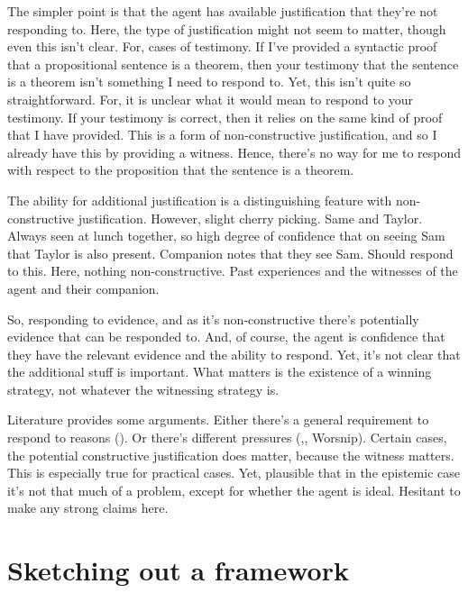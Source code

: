 \documentclass[10pt]{article}
\begin{document}
\begin{note}
  The simpler point is that the agent has available justification that they're not responding to.
  Here, the type of justification might not seem to matter, though even this isn't clear.
  For, cases of testimony.
  If I've provided a syntactic proof that a propositional sentence is a theorem, then your testimony that the sentence is a theorem isn't something I need to respond to.
  Yet, this isn't quite so straightforward.
  For, it is unclear what it would mean to respond to your testimony.
  If your testimony is correct, then it relies on the same kind of proof that I have provided.
  This is a form of non-constructive justification, and so I already have this by providing a witness.
  Hence, there's no way for me to respond with respect to the proposition that the sentence is a theorem.

  The ability for additional justification is a distinguishing feature with non-constructive justification.
  However, slight cherry picking.
  Same and Taylor.
  Always seen at lunch together, so high degree of confidence that on seeing Sam that Taylor is also present.
  Companion notes that they see Sam.
  Should respond to this.
  Here, nothing non-constructive.
  Past experiences and the witnesses of the agent and their companion.
\end{note}

\begin{note}
  So, responding to evidence, and as it's non-constructive there's potentially evidence that can be responded to.
  And, of course, the agent is confidence that they have the relevant evidence and the ability to respond.
  Yet, it's not clear that the additional stuff is important.
  What matters is the existence of a winning strategy, not whatever the witnessing strategy is.

  Literature provides some arguments.
  Either there's a general requirement to respond to reasons (\cite{Lord:2018aa}).
  Or there's different pressures (\cite{Pryor:2018aa},\cite{Fogal:2019aa}, Worsnip).
  Certain cases, the potential constructive justification does matter, because the witness matters.
  This is especially true for practical cases.
  Yet, plausible that in the epistemic case it's not that much of a problem, except for whether the agent is ideal.
  Hesitant to make any strong claims here.
\end{note}


\section{Sketching out a framework}
\label{sec:sketch-out-fram}
\end{document}
